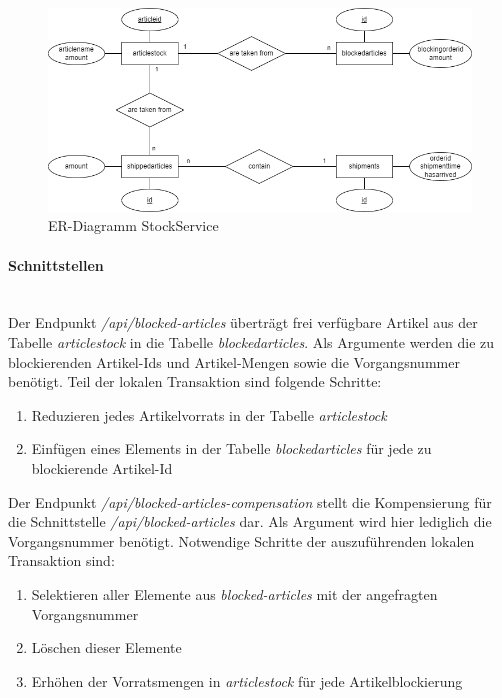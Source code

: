\begin{figure}[h!]
	\centering
	\includegraphics[scale=0.5]{figures/DatabaseER/StockServiceTables.png}
	\caption{ER-Diagramm StockService}
\end{figure}
\FloatBarrier

\paragraph*{Schnittstellen} \mbox{}\\

Der Endpunkt \textit{/api/blocked-articles} überträgt frei verfügbare Artikel aus der Tabelle \textit{articlestock} in die Tabelle \textit{blockedarticles}. Als Argumente werden die zu blockierenden Artikel-Ids und Artikel-Mengen sowie die Vorgangsnummer benötigt. Teil der lokalen Transaktion sind folgende Schritte:
\begin{enumerate}
	\item Reduzieren jedes Artikelvorrats in der Tabelle \textit{articlestock}
	\item Einfügen eines Elements in der Tabelle \textit{blockedarticles} für jede zu blockierende Artikel-Id
\end{enumerate}

Der Endpunkt \textit{/api/blocked-articles-compensation} stellt die Kompensierung für die Schnittstelle \textit{/api/blocked-articles} dar. Als Argument wird hier lediglich die Vorgangsnummer benötigt. Notwendige Schritte der auszuführenden lokalen Transaktion sind:
\begin{enumerate}
	\item Selektieren aller Elemente aus \textit{blocked-articles} mit der angefragten Vorgangsnummer
	\item Löschen dieser Elemente
	\item Erhöhen der Vorratsmengen in \textit{articlestock} für jede Artikelblockierung
\end{enumerate}

